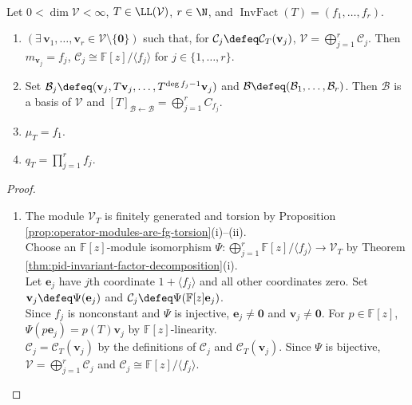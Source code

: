 \begin{theorem} \label{thm:operator-invariant-factor-skeleton} \\
Let $0<\dim\mathcal{V}<\infty$, $T\in\LL(\mathcal{V})$, $r\in\N$, and $\operatorname{InvFact}(T)=(f_1,\ldots,f_r)$.
\begin{enumerate}[label=(\roman*)]
\setlength{\itemsep}{0pt}
\item $(\exists\,\mathbf{v}_1,\ldots,\mathbf{v}_r\in\mathcal{V}\setminus\{\mathbf{0}\})$ such that, for $\mathcal{C}_j\defeq\mathcal{C}_T(\mathbf{v}_j)$, $\mathcal{V}=\bigoplus\limits_{j=1}^r\mathcal{C}_j$. Then $m_{\mathbf{v}_j}=f_j$, $\mathcal{C}_j\cong\mathbb{F}[z]/\langle f_j\rangle$ for $j\in\{1,\ldots,r\}$.
\item Set $\mathcal{B}_j\defeq(\mathbf{v}_j,T\mathbf{v}_j,\ldots,T^{\deg f_j-1}\mathbf{v}_j)$ and $\mathcal{B}\defeq(\mathcal{B}_1,\ldots,\mathcal{B}_r)$. Then $\mathcal{B}$ is a basis of $\mathcal{V}$ and $[T]_{\mathcal{B}\leftarrow\mathcal{B}}=\bigoplus\limits_{j=1}^rC_{f_j}$.
\item $\mu_T=f_1$.
\item $q_T=\prod\limits_{j=1}^rf_j$.
\end{enumerate}
\begin{proof}
\begin{enumerate}[label=(\roman*)]
\setlength{\itemsep}{0pt}
\item The module $\mathcal{V}_T$ is finitely generated and torsion by Proposition \ref{prop:operator-modules-are-fg-torsion}(i)--(ii).\\
Choose an $\mathbb{F}[z]$-module isomorphism $\Psi:\bigoplus\limits_{j=1}^r\mathbb{F}[z]/\langle f_j\rangle\to\mathcal{V}_T$ by Theorem \ref{thm:pid-invariant-factor-decomposition}(i).\\
Let $\mathbf{e}_j$ have $j$th coordinate $1+\langle f_j\rangle$ and all other coordinates zero. Set $\mathbf{v}_j\defeq\Psi(\mathbf{e}_j)$ and $\mathcal{C}_j\defeq\Psi(\mathbb{F}[z]\mathbf{e}_j)$.\\
Since $f_j$ is nonconstant and $\Psi$ is injective, $\mathbf{e}_j\neq\mathbf{0}$ and $\mathbf{v}_j\neq\mathbf{0}$. For $p\in\mathbb{F}[z]$, $\Psi(p\mathbf{e}_j)=p(T)\mathbf{v}_j$ by $\mathbb{F}[z]$-linearity.\\
$\mathcal{C}_j=\mathcal{C}_T(\mathbf{v}_j)$ by the definitions of $\mathcal{C}_j$ and $\mathcal{C}_T(\mathbf{v}_j)$. Since $\Psi$ is bijective, $\mathcal{V}=\bigoplus\limits_{j=1}^r\mathcal{C}_j$ and $\mathcal{C}_j\cong\mathbb{F}[z]/\langle f_j\rangle$.\\

\end{enumerate}
\end{proof}
\end{theorem}

